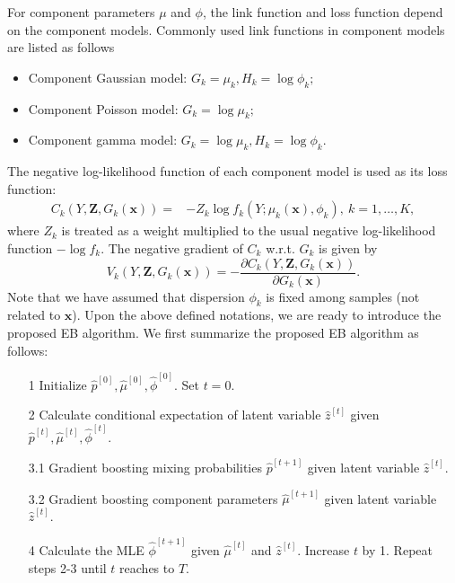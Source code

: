 \documentclass[11pt]{article}
\numberwithin{equation}{section}
\def\bx{\boldsymbol{x}}
\def\bZ{\boldsymbol{Z}}
\newcommand{\blue}[1]{\textcolor{blue}{#1}}
\begin{document}
For component parameters $\mu$ and $\phi$, the link function and loss function  depend on the component models.
Commonly used link functions in component models are listed as follows
	\begin{itemize}
		\item Component Gaussian model:
		$G_k=\mu_k, H_k=\log \phi_k;$
		\item Component Poisson model:
		$G_k=\log\mu_k;$
		\item Component gamma model:
				$G_k=\log \mu_k, H_k=\log \phi_k.$
	\end{itemize}
The negative log-likelihood function of each component model is used as its loss function:
	\begin{equation}
		\begin{aligned}
			{C_k(Y,\bZ,G_k(\bx))}=& -Z_k\log f_k(Y;\mu_k(\bx),\phi_k), ~ k=1,\ldots,K,
		\end{aligned}
	\end{equation}
where $Z_k$ is treated as a weight multiplied to the usual negative log-likelihood function $-\log f_k$.
	The negative gradient of $C_k$ w.r.t. $G_k$ is given by 
	$${V_k(Y,\bZ,G_k(\bx))}=-\frac{\partial C_k(Y,\bZ,G_k(\bx))}{\partial G_k(\bx)}.$$
	Note that we have assumed that dispersion $\phi_k$ is fixed among samples (not related to $\bx$). 
Upon the above defined notations, we are ready to introduce the proposed EB algorithm.
We first summarize the proposed EB algorithm as follows:
\begin{enumerate}
	\item[1] Initialize $\hat{p}^{[0]},\hat{\mu}^{[0]},\hat{\phi}^{[0]}$. Set $t=0$.
	\item[2] Calculate conditional expectation of latent variable $\hat{z}^{[t]}$ given $\hat{p}^{[t]},\hat{\mu}^{[t]},\hat{\phi}^{[t]}$.
	\item[3.1]  Gradient boosting mixing probabilities $\hat{p}^{[t+1]}$  given latent variable $\hat{z}^{[t]}$.
	\item[3.2] Gradient boosting component parameters $\hat{\mu}^{[t+1]}$ given latent variable $\hat{z}^{[t]}$.
	\item[4]  Calculate the MLE $\hat{\phi}^{[t+1]}$ given $\hat{\mu}^{[t]}$ and $\hat{z}^{[t]}$. Increase $t$ by 1. Repeat steps 2-3 until $t$ reaches to $T$.
\end{enumerate}
\end{document}
